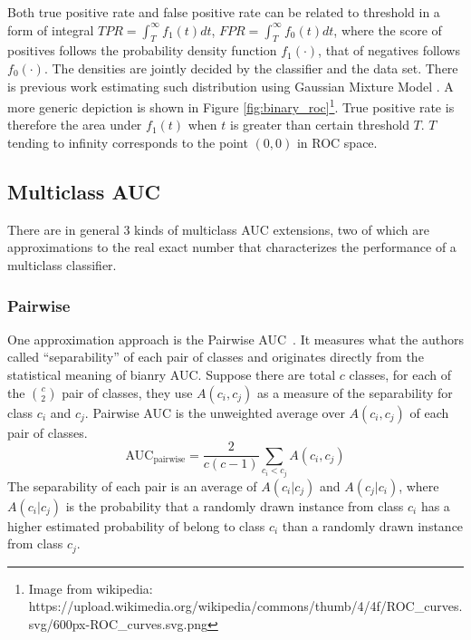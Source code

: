 \documentclass[twoside,11pt]{article}
\renewcommand{\>}{{\rightarrow}}
\newcommand{\1}{{\mathbf 1}}
\newcommand{\0}{{\mathbf 0}}
\begin{document}
Both true positive rate and false positive rate can be related to threshold in a form of integral $TPR=\int_{T}^{\infty}f_1(t)dt$, $FPR = \int_{T}^{\infty}f_0(t)dt$,
where the score of positives follows the probability density function $f_1(\cdot)$, that of negatives follows $f_0(\cdot)$. The densities are jointly decided by the classifier and the data set. There is previous work estimating such distribution using Gaussian Mixture Model  \cite{gmm}. A more generic depiction is shown in Figure \ref{fig:binary_roc}\footnote{Image from wikipedia: https://upload.wikimedia.org/wikipedia/commons/thumb/4/4f/ROC\_curves.svg/600px-ROC\_curves.svg.png}. True positive rate is therefore the area under $f_1(t)$ when $t$ is greater than certain threshold $T$. $T$ tending to infinity corresponds to the point $(0,0)$ in ROC space. %

\subsection{Multiclass AUC}

There are in general 3 kinds of multiclass AUC extensions, two of which are approximations to the real exact number that characterizes the performance of a multiclass classifier. 

\subsubsection{Pairwise}\label{sec:pairwise-intro}
One approximation approach is the Pairwise AUC~\cite{Hand2001}. It measures what the authors called ``separability'' of each pair of classes and originates directly from the statistical meaning of bianry AUC. Suppose there are total $c$ classes, for each of the ${c \choose 2}$ pair of classes, they use $A(c_i, c_j)$ as a measure of the separability for class $c_i$ and $c_j$. Pairwise AUC is the unweighted average over  $A(c_i,c_j)$ of each pair of classes.\\
\begin{equation}\label{eq:pairwise-AUC}
    \text{AUC}_{\text{pairwise}} = \frac{2}{c(c-1)}\sum\limits_{c_i<c_j}A(c_i,c_j)
\end{equation}
The separability of each pair is an average of $A(c_i|c_j)$ and $A(c_j|c_i)$, where $A(c_i|c_j)$ is the probability that a randomly drawn instance from class $c_i$ has a higher estimated probability of belong to class $c_i$ than a randomly drawn instance from class $c_j$.
\end{document}
